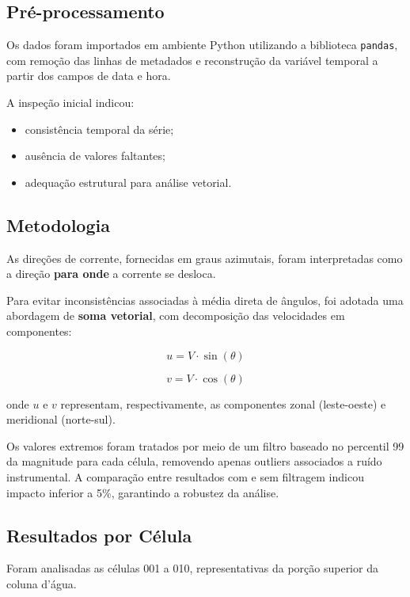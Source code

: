 \documentclass[a4paper,12pt]{article}
\begin{document}
\subsection{Pré-processamento}

Os dados foram importados em ambiente Python utilizando a biblioteca \texttt{pandas}, com remoção das linhas de metadados e reconstrução da variável temporal a partir dos campos de data e hora.

A inspeção inicial indicou:
\begin{itemize}
    \item consistência temporal da série;
    \item ausência de valores faltantes;
    \item adequação estrutural para análise vetorial.
\end{itemize}

\subsection{Metodologia}

As direções de corrente, fornecidas em graus azimutais, foram interpretadas como a direção \textbf{para onde} a corrente se desloca.

Para evitar inconsistências associadas à média direta de ângulos, foi adotada uma abordagem de \textbf{soma vetorial}, com decomposição das velocidades em componentes:

\begin{equation}
u = V \cdot \sin(\theta)
\end{equation}

\begin{equation}
v = V \cdot \cos(\theta)
\end{equation}

onde $u$ e $v$ representam, respectivamente, as componentes zonal (leste-oeste) e meridional (norte-sul).

Os valores extremos foram tratados por meio de um filtro baseado no percentil 99 da magnitude para cada célula, removendo apenas outliers associados a ruído instrumental. A comparação entre resultados com e sem filtragem indicou impacto inferior a 5\%, garantindo a robustez da análise.

\subsection{Resultados por Célula}

Foram analisadas as células 001 a 010, representativas da porção superior da coluna d'água.
\end{document}
